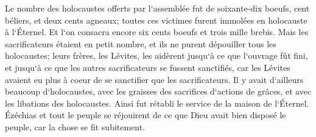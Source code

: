\verse Le nombre des holocaustes offerts par l`assemblée fut de soixante-dix boeufs, cent béliers, et deux cents agneaux; toutes ces victimes furent immolées en holocauste à l`Éternel. 
\verse Et l`on consacra encore six cents boeufs et trois mille brebis. 
\verse Mais les sacrificateurs étaient en petit nombre, et ils ne purent dépouiller tous les holocaustes; leurs frères, les Lévites, les aidèrent jusqu`à ce que l`ouvrage fût fini, et jusqu`à ce que les autres sacrificateurs se fussent sanctifiés, car les Lévites avaient eu plus à coeur de se sanctifier que les sacrificateurs. 
\verse Il y avait d`ailleurs beaucoup d`holocaustes, avec les graisses des sacrifices d`actions de grâces, et avec les libations des holocaustes. Ainsi fut rétabli le service de la maison de l`Éternel. 
\verse Ézéchias et tout le peuple se réjouirent de ce que Dieu avait bien disposé le peuple, car la chose se fit subitement. 

\chapter{}

